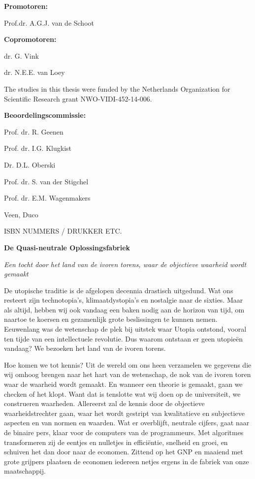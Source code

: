 \newpage

\pagestyle{empty}
\textbf{Promotoren:}


Prof.dr. A.G.J. van de Schoot

\textbf{Copromotoren:}

dr. G. Vink

dr. N.E.E. van Loey

\vspace*{\fill}

\noindent The studies in this thesis were funded by the Netherlands Organization for Scientific Research grant NWO-VIDI-452-14-006.

% 

\newpage


\textbf{Beoordelingscommissie:}

Prof. dr. R. Geenen

Prof. dr. I.G. Klugkist

Dr. D.L. Oberski 

Prof. dr. S. van der Stigchel

Prof. dr. E.M. Wagenmakers 

\vspace*{\fill}

\noindent Veen, Duco

\noindent ISBN NUMMERS / DRUKKER ETC.

\newpage

\textbf{De Quasi-neutrale Oplossingsfabriek}

\textit{Een tocht door het land van de ivoren torens, waar de objectieve waarheid wordt gemaakt}

De utopische traditie is de afgelopen decennia drastisch uitgedund. Wat ons resteert zijn technotopia's, klimaatdystopia's en nostalgie naar de sixties. Maar als altijd, hebben wij ook vandaag een baken nodig aan de horizon van tijd, om naartoe te koersen en gezamenlijk grote beslissingen te kunnen nemen. Eeuwenlang was de wetenschap de plek bij uitstek waar Utopia ontstond, vooral ten tijde van een intellectuele revolutie. Dus waarom ontstaan er geen utopieën vandaag? We bezoeken het land van de ivoren torens.

Hoe komen we tot kennis? Uit de wereld om ons heen verzamelen we gegevens die wij omhoog brengen naar het hart van de wetenschap, de nok van de ivoren toren waar de waarheid wordt gemaakt. En wanneer een theorie is gemaakt, gaan we checken of het klopt. Want dat is tenslotte wat wij doen op de universiteit, we construeren waarheden. Allereerst zal de kennis door de objectieve waarheidstrechter gaan, waar het wordt gestript van kwalitatieve en subjectieve aspecten en van normen en waarden. Wat er overblijft, neutrale cijfers, gaat naar de binaire pers, klaar voor de computers van de programmeurs. Met algoritmes transformeren zij de eentjes en nulletjes in efficiëntie, snelheid en groei, en schuiven het dan door naar de economen. Zittend op het GNP en maaiend met grote grijpers plaatsen de economen iedereen netjes ergens in de fabriek van onze maatschappij.

